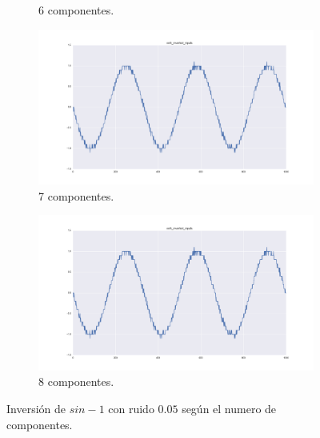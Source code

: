 \documentclass[11pt,spanish,listoffigures,listoftables]{tfgetsinf}
\begin{document}
\begin{figure}[H]
\begin{subfigure}[h]{0.33\textwidth}
                \caption{6 componentes.}
                \label{fig:col5_inverted_nipals6}
            \end{subfigure}
            \begin{subfigure}[h]{0.33\textwidth}
                \centering
                \includegraphics[width=\textwidth]{simulated_data_8_columns/col5_inverted_nipals_7.png}
                \caption{7 componentes.}
                \label{fig:col5_inverted_nipals7}
            \end{subfigure}
            \begin{subfigure}[h]{0.33\textwidth}
                \centering
                \includegraphics[width=\textwidth]{simulated_data_8_columns/col5_inverted_nipals_8.png}
                \caption{8 componentes.}
                \label{fig:col5_inverted_nipals8}
            \end{subfigure}
            \caption{Inversión de \(sin - 1\) con ruido \(0.05\) según el numero de componentes.}
            \label{fig:col5_inverted_nipals_n_components}
        \end{figure}
        
\end{document}
